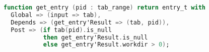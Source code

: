 \begin{lstlisting}[caption={Functional and data contracts}, label={code:formal verification example}, language=Ada]
function get_entry (pid : tab_range) return entry_t with
  Global => (input => tab),
  Depends => (get_entry'Result => (tab, pid)),
  Post => (if tab(pid).is_null
           then get_entry'Result.is_null
           else get_entry'Result.workdir > 0);
\end{lstlisting}

